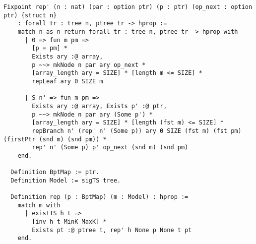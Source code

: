 \documentclass{article}
\newcommand{\hide}[1]{}
\begin{document}
\begin{lstlisting}
Fixpoint rep' (n : nat) (par : option ptr) (p : ptr) (op_next : option ptr) {struct n} 
    : forall tr : tree n, ptree tr -> hprop :=
    match n as n return forall tr : tree n, ptree tr -> hprop with 
      | 0 => fun m pm =>
        [p = pm] *
        Exists ary :@ array,
        p ~~> mkNode n par ary op_next *
        [array_length ary = SIZE] * [length m <= SIZE] *
        repLeaf ary 0 SIZE m
        
      | S n' => fun m pm =>
        Exists ary :@ array, Exists p' :@ ptr,
        p ~~> mkNode n par ary (Some p') *
        [array_length ary = SIZE] * [length (fst m) <= SIZE] *
        repBranch n' (rep' n' (Some p)) ary 0 SIZE (fst m) (fst pm) (firstPtr (snd m) (snd pm)) *
        rep' n' (Some p) p' op_next (snd m) (snd pm)
    end.

  Definition BptMap := ptr.
  Definition Model := sigTS tree.

  Definition rep (p : BptMap) (m : Model) : hprop :=
    match m with
      | existTS h t => 
        [inv h t MinK MaxK] *
        Exists pt :@ ptree t, rep' h None p None t pt
    end.
\end{lstlisting}

\hide{
\newpage
\section{Continuation ({\tt BPlusTreeContinuation.v})}

\begin{lstlisting}
Fixpoint repBranch (h : nat)
  (rep' : ptr -> option ptr -> (option ptr -> hprop) -> tree h -> hprop) 
  (ary : array) (i : nat) (ls : list (sigTS (fun _:key => tree h)))
  (op : option ptr) (c : option ptr-> hprop) {struct ls} : hprop :=
  match ls with
    | nil =>
      {@ (p :~~ array_plus ary i in p ~~> @None (key * ptr)) | i <- i + (SIZE - i)} * 
      c op
    | f :: r => 
      p :~~ array_plus ary i in Exists p' :@ ptr, p ~~> (Some (projT1S f, p')) *
      rep' p' op (fun op => repBranch h rep' ary (S i) r op c) (projT2S f)
  end.

Fixpoint rep' (n : nat) (p : ptr) (op : option ptr) 
  (c : option ptr -> hprop) (t : tree n) {struct n} : hprop :=
  Exists a :@ nodeType, p ~~> a * [height a = n] *
  match n as n return tree n -> hprop with 
    | 0 => fun ls =>
      [array_length (content a) = SIZE] * [op = Some p] * [length ls <= SIZE] *
      repLeaf (content a) 0 SIZE ls * (c (next a))
        
    | S n' => fun m =>
      let ls  := fst m in
      let nxt := snd m in
      [array_length (content a) = SIZE] * [length ls <= SIZE] *
      Exists np :@ ptr, [next a = Some np] *
      repBranch n' (rep' n') (content a) 0 ls op 
          (fun op => Exists p' :@ ptr, np ~~> p' * rep' n' p' op c nxt)
  end t.

Definition tH := sigTS tree.
Definition BptMap := (ptr * [tH])%type.

Definition rep (t : BptMap) (m : Model) : hprop :=
  let p := fst t in
  bpt :~~ snd t in
  match bpt with
    | existTS h t => Exists hdl :@ ptr,
      [m = as_map h t] *
      rep' h p (Some hdl) (fun x:option ptr => [x = None]) t * [inv h t MinK MaxK]
  end.
\end{lstlisting}
}
\end{document}
